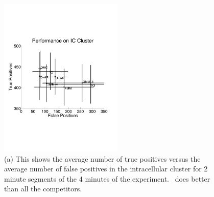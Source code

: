 \begin{figure}[htbp]
	\centering
 	\includegraphics[height=3in]{../figs/supfigs/clusterpermerr.pdf}
	\caption{(a) This shows the average number of true positives versus the average number of false positives in the intracellular cluster for 2 minute segments of the 4 minutes of the experiment.  \smug\ does better than all the competitors.  }
	\label{fig:asdf}
\end{figure}




